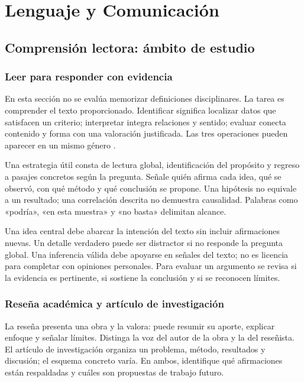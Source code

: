 \chapter{Lenguaje y Comunicación}
\section{Comprensión lectora: ámbito de estudio}\label{sec:l1}
\subsection{Leer para responder con evidencia}
En esta sección no se evalúa memorizar definiciones disciplinares. La tarea es comprender el texto proporcionado. Identificar significa localizar datos que satisfacen un criterio; interpretar integra relaciones y sentido; evaluar conecta contenido y forma con una valoración justificada. Las tres operaciones pueden aparecer en un mismo género \cite[págs. 18--23]{ceneval}.

Una estrategia útil consta de lectura global, identificación del propósito y regreso a pasajes concretos según la pregunta. Señale quién afirma cada idea, qué se observó, con qué método y qué conclusión se propone. Una hipótesis no equivale a un resultado; una correlación descrita no demuestra causalidad. Palabras como «podría», «en esta muestra» y «no basta» delimitan alcance.

Una idea central debe abarcar la intención del texto sin incluir afirmaciones nuevas. Un detalle verdadero puede ser distractor si no responde la pregunta global. Una inferencia válida debe apoyarse en señales del texto; no es licencia para completar con opiniones personales. Para evaluar un argumento se revisa si la evidencia es pertinente, si sostiene la conclusión y si se reconocen límites.

\subsection{Reseña académica y artículo de investigación}
La reseña presenta una obra y la valora: puede resumir su aporte, explicar enfoque y señalar límites. Distinga la voz del autor de la obra y la del reseñista. El artículo de investigación organiza un problema, método, resultados y discusión; el esquema concreto varía. En ambos, identifique qué afirmaciones están respaldadas y cuáles son propuestas de trabajo futuro.

